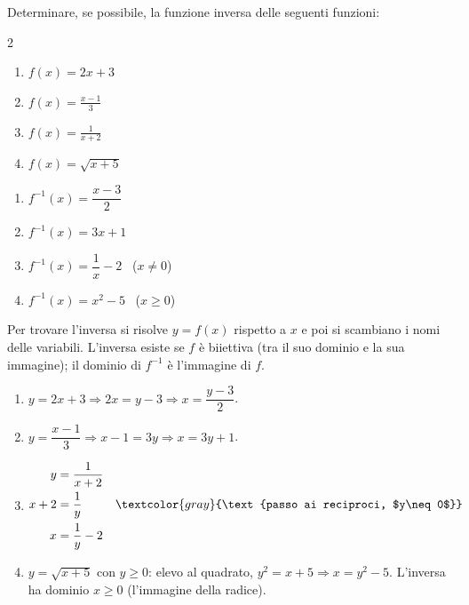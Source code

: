 \begin{question}[ID=4.1, subtitle={Funzione inversa — serie 1}, difficulty=media, tags={funzioni,inversa}]
Determinare, se possibile, la funzione inversa delle seguenti funzioni:

\begin{center}\begin{minipage}{0.92\linewidth}
\begin{multicols}{2}
\begin{enumerate}[leftmargin=3.2cm]
\item $f(x)=2x+3$
\item $f(x)=\frac{x-1}{3}$
\item $f(x)=\frac{1}{x+2}$
\item $f(x)=\sqrt{x+5}$
\end{enumerate}
\end{multicols}
\end{minipage}\end{center}
\begin{solution}
\begin{enumerate}
    \item $f^{-1}(x)=\dfrac{x-3}{2}$
    \item $f^{-1}(x)=3x+1$
    \item $f^{-1}(x)=\dfrac1x-2$ \ ($x\neq0$)
    \item $f^{-1}(x)=x^2-5$ \ ($x\geq0$)
\end{enumerate}
\end{solution}
\begin{explanation}
Per trovare l'inversa si risolve $y=f(x)$ rispetto a $x$ e poi si scambiano i nomi delle variabili. L'inversa esiste se $f$ è biiettiva (tra il suo dominio e la sua immagine); il dominio di $f^{-1}$ è l'immagine di $f$.
\begin{enumerate}
    \item $y=2x+3 \Rightarrow 2x=y-3 \Rightarrow x=\dfrac{y-3}{2}$.
    \item $y=\dfrac{x-1}{3} \Rightarrow x-1=3y \Rightarrow x=3y+1$.
    \item \[\begin{aligned}
    y &= \dfrac{1}{x+2}\\
    x+2 &= \dfrac1y && \textcolor{gray}{\text{passo ai reciproci, $y\neq0$}}\\
    x &= \dfrac1y-2
    \end{aligned}\]
    \item $y=\sqrt{x+5}$ con $y\geq0$: elevo al quadrato, $y^2=x+5 \Rightarrow x=y^2-5$. L'inversa ha dominio $x\geq0$ (l'immagine della radice).
\end{enumerate}
\end{explanation}

\end{question}

